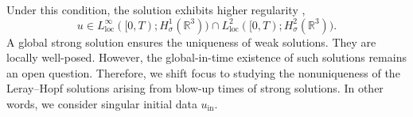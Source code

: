 \documentclass[11pt,a4paper]{article}
\numberwithin{equation}{section}
\newcommand{\tmop}[1]{\ensuremath{\operatorname{#1}}}
\newtheorem{proposition}{Proposition}
{\theorembodyfont{\rmfamily}\newtheorem{remark}{Remark}}
\begin{document}
 Under this condition, the solution exhibits higher regularity \cite{prodi1959teorema, serrin1963initial, sverak2003},
  \[ u \in L^{\infty}_{\tmop{loc}} ([0, T) ; H^{1}_{\sigma} (\mathbb{R}^3))
     \cap L^2_{\tmop{loc}} ([0, T) ; H^{2}_{\sigma} (\mathbb{R}^3)). \]
 A global strong solution ensures the uniqueness of weak solutions. They are locally well-posed. However, the
global-in-time existence of such solutions remains an open question.
 Therefore, we shift focus to studying the nonuniqueness of the
Leray--Hopf solutions arising from blow-up times of strong solutions. In other
words, we consider singular initial data $u_{\tmop{in}}$.

 
\end{document}
